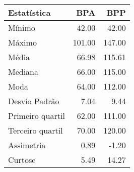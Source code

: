 \begin{table}[ht]
\centering
\begin{tabular}{lrr}
  \hline
Estatística & BPA & BPP \\ 
  \hline
Mínimo & 42.00 & 42.00 \\ 
  Máximo & 101.00 & 147.00 \\ 
  Média & 66.98 & 115.61 \\ 
  Mediana & 66.00 & 115.00 \\ 
  Moda & 64.00 & 112.00 \\ 
  Desvio Padrão & 7.04 & 9.44 \\ 
  Primeiro quartil & 62.00 & 111.00 \\ 
  Terceiro quartil & 70.00 & 120.00 \\ 
  Assimetria & 0.89 & -1.20 \\ 
  Curtose & 5.49 & 14.27 \\ 
   \hline
\end{tabular}
\end{table}
